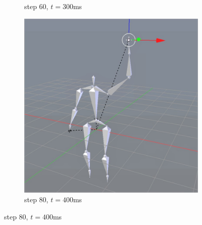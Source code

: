 \documentclass[10pt,twocolumn,letterpaper]{article}
\begin{document}
\begin{figure}[]
\begin{subfigure}{0.2\textwidth}
        \caption{step 60, $t=300$ms}
    \end{subfigure}\begin{subfigure}{0.2\textwidth}
        \centering
        \includegraphics[width=.9\linewidth]{raise-circ-4.jpg}
        \caption{step 80, $t=400$ms}
    \end{subfigure}


\end{figure}
\end{document}
